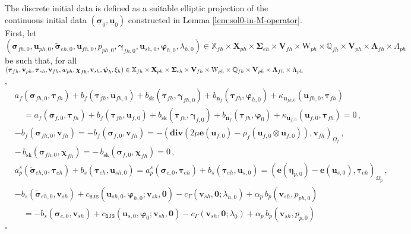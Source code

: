 \documentclass[11pt]{article}
\numberwithin{equation}{section}
\newcommand{\ds}{\displaystyle}
\newcommand{\bgamma}{{\boldsymbol\gamma}}
\newcommand{\bLambda}{{\boldsymbol\Lambda}}
\newcommand{\bbeta}{{\boldsymbol\eta}}
\newcommand{\bsi}{{\boldsymbol\sigma}}
\newcommand{\bSigma}{{\boldsymbol\Sigma}}
\newcommand{\bvarphi}{{\boldsymbol\varphi}}
\newcommand{\bpsi}{{\boldsymbol\psi}}
\newcommand{\btau}{{\boldsymbol\tau}}
\newcommand{\bchi}{{\boldsymbol\chi}}
\newcommand{\ubsi}{\underline{\bsi}}
\newcommand{\ubu}{\underline{\bu}}
\newcommand{\bv}{{\mathbf{v}}}
\newcommand{\bu}{\mathbf{u}}
\newcommand{\bn}{{\mathbf{n}}}
\newcommand{\be}{{\mathbf{e}}}
\newcommand{\0}{{\mathbf{0}}}
\def\bX{\mathbf{X}}
\def\bV{\mathbf{V}}
\newcommand\bbQ{\mathbb{Q}}
\newcommand\bbX{\mathbb{X}}
\def\W{\mathrm{W}}
\def\BJS{\mathtt{BJS}}
\def\bdiv{\mathbf{div}}
\def\sk{\mathrm{sk}}
\newenvironment{proof}{\noindent{\it Proof.}}{\hfill$\square$}
\numberwithin{equation}{section}
\begin{document}
%
\begin{proof}
The discrete initial data is defined as a suitable elliptic projection of the continuous initial data $(\ubsi_0,\ubu_0)$ constructed in Lemma \ref{lem:sol0-in-M-operator}. 
First, let $(\bsi_{fh,0}, \bu_{ph,0}, \widetilde\bsi_{eh,0}, \bu_{fh,0}, p_{ph,0}, \bgamma_{fh,0}, \bu_{sh,0}, \bvarphi_{h,0}, \lambda_{h,0}) \in \bbX_{fh}\times \bX_{ph}\times \bSigma_{eh}\times \bV_{fh}\times \W_{ph}\times \bbQ_{fh}\times \bV_{ph}\times \bLambda_{fh}\times \Lambda_{ph}$ be such that, for all $(\btau_{fh}, \bv_{ph}, \btau_{eh}, \bv_{fh}, w_{ph}, \bchi_{fh}, \linebreak \bv_{sh}, \bpsi_{h}, \xi_{h})\in \bbX_{fh}\times \bX_{ph}\times \bSigma_{eh}\times \bV_{fh}\times \W_{ph}\times \bbQ_{fh}\times \bV_{ph}\times \bLambda_{fh}\times \Lambda_{ph}$,
%
\begin{subequations}\label{eq:system-discrete-sol0-1}
\begin{align}
& \ds a_f(\bsi_{fh,0},\btau_{fh}) + b_f(\btau_{fh},\bu_{fh,0}) + b_{\sk}(\btau_{fh},\bgamma_{fh,0}) + b_{\bn_f}(\btau_{fh},\bvarphi_{h,0}) + \kappa_{\bu_{fh,0}}(\bu_{fh,0},\btau_{fh})\nonumber \\[1ex] 
& \ds \quad = a_f(\bsi_{f,0},\btau_{fh}) + b_f(\btau_{fh},\bu_{f,0}) + b_{\sk}(\btau_{fh},\bgamma_{f,0}) + b_{\bn_f}(\btau_{fh},\bvarphi_{0}) + \kappa_{\bu_{f,0}}(\bu_{f,0},\btau_{fh}) = 0\,, \label{eq:semi-discrete-weak-formulation-1a}  \\[1ex] 
& \ds - b_f(\bsi_{fh,0},\bv_{fh})
= - b_f(\bsi_{f,0},\bv_{fh}) =  -(\bdiv(2\mu\be(\bu_{f,0}) - \rho_f(\bu_{f,0}\otimes \bu_{f,0})),\bv_{fh})_{\Omega_f}\,, \label{eq:semi-discrete-weak-formulation-1b}  \\[1ex] 
& \ds -\,b_{\sk}(\bsi_{fh,0},\bchi_{fh}) =  -\,b_{\sk}(\bsi_{f,0},\bchi_{fh}) = 0 \,, \label{eq:semi-discrete-weak-formulation-1c} \\[1ex]
& \ds  a^s_p(\widetilde\bsi_{eh,0},\btau_{eh}) + b_s(\btau_{eh},\bu_{sh,0})= a^s_p(\bsi_{e,0},\btau_{eh}) + b_s(\btau_{eh},\bu_{s,0})
= ( \be(\bbeta_{p,0}) - \be(\bu_{s,0}),\btau_{eh})_{\Omega_p}\,,
\label{eq:semi-discrete-weak-formulation-1d} \\[1ex] 
& \ds - b_s(\widetilde\bsi_{eh,0},\bv_{sh})  + c_{\BJS}(\bu_{sh,0},\bvarphi_{h,0};\bv_{sh},\0) - c_{\Gamma}(\bv_{sh},\0;\lambda_{h,0}) + \alpha_p\,b_p(\bv_{sh},p_{ph,0}) \nonumber \\[1ex] 
& \ds \quad =
-b_s(\bsi_{e,0},\bv_{sh})  + c_{\BJS}(\bu_{s,0},\bvarphi_{0};\bv_{sh},\0) - c_{\Gamma}(\bv_{sh},\0;\lambda_{0}) + \alpha_p\,b_p(\bv_{sh},p_{p,0}) \nonumber \\[1ex]

\end{align}
\end{subequations}
\end{proof}
\end{document}
